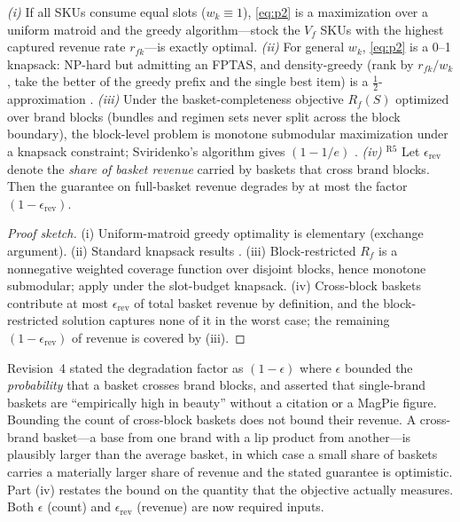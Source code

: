 \begin{theorem}\label{thm:assortment}
\emph{(i)} If all SKUs consume equal slots ($w_k\equiv1$), \eqref{eq:p2} is a maximization over a uniform matroid and the greedy algorithm---stock the $V_f$ SKUs with the highest captured revenue rate $r_{fk}$---is exactly optimal.
\emph{(ii)} For general $w_k$, \eqref{eq:p2} is a 0--1 knapsack: NP-hard but admitting an FPTAS, and density-greedy (rank by $r_{fk}/w_k$, take the better of the greedy prefix and the single best item) is a $\tfrac12$-approximation \cite{kellerer2004}.
\emph{(iii)} Under the basket-completeness objective $R_f(S)$ optimized over brand blocks (bundles and regimen sets never split across the block boundary), the block-level problem is monotone submodular maximization under a knapsack constraint; Sviridenko's algorithm gives $(1-1/e)$ \cite{sviridenko2004}.
\emph{(iv)} $^{\mathrm{R5}}$ Let $\epsilon_{\mathrm{rev}}$ denote the \emph{share of basket revenue} carried by baskets that cross brand blocks. Then the guarantee on full-basket revenue degrades by at most the factor $(1-\epsilon_{\mathrm{rev}})$.
\end{theorem}
\begin{proof}[Proof sketch]
(i) Uniform-matroid greedy optimality is elementary (exchange argument). (ii) Standard knapsack results \cite{kellerer2004}. (iii) Block-restricted $R_f$ is a nonnegative weighted coverage function over disjoint blocks, hence monotone submodular; apply \cite{sviridenko2004} under the slot-budget knapsack. (iv) Cross-block baskets contribute at most $\epsilon_{\mathrm{rev}}$ of total basket revenue by definition, and the block-restricted solution captures none of it in the worst case; the remaining $(1-\epsilon_{\mathrm{rev}})$ of revenue is covered by (iii).
\end{proof}

\begin{remark}
Revision~4 stated the degradation factor as $(1-\epsilon)$ where $\epsilon$ bounded the \emph{probability} that a basket crosses brand blocks, and asserted that single-brand baskets are ``empirically high in beauty'' without a citation or a MagPie figure. Bounding the count of cross-block baskets does not bound their revenue. A cross-brand basket---a base from one brand with a lip product from another---is plausibly larger than the average basket, in which case a small share of baskets carries a materially larger share of revenue and the stated guarantee is optimistic. Part (iv) restates the bound on the quantity that the objective actually measures. Both $\epsilon$ (count) and $\epsilon_{\mathrm{rev}}$ (revenue) are now required inputs. 
\end{remark}

